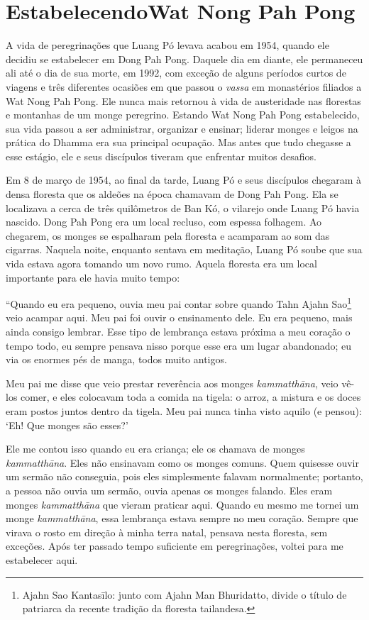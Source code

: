 \chapter[Estabelecendo Wat Nong Pah Pong]{Estabelecendo\newline Wat Nong Pah Pong}

A vida de peregrinações que Luang Pó levava acabou em 1954, quando ele
decidiu se estabelecer em Dong Pah Pong. Daquele dia em diante, ele
permaneceu ali até o dia de sua morte, em 1992, com exceção de alguns
períodos curtos de viagens e três diferentes ocasiões em que passou o
\emph{vassa} em monastérios filiados a Wat Nong Pah Pong. Ele nunca mais
retornou à vida de austeridade nas florestas e montanhas de um monge
peregrino. Estando Wat Nong Pah Pong estabelecido, sua vida passou a ser
administrar, organizar e ensinar; liderar monges e leigos na prática do
Dhamma era sua principal ocupação. Mas antes que tudo chegasse a esse
estágio, ele e seus discípulos tiveram que enfrentar muitos desafios.

Em 8 de março de 1954, ao final da tarde, Luang Pó e seus discípulos
chegaram à densa floresta que os aldeões na época chamavam de Dong Pah
Pong. Ela se localizava a cerca de três quilômetros de Ban Kó, o
vilarejo onde Luang Pó havia nascido. Dong Pah Pong era um local
recluso, com espessa folhagem. Ao chegarem, os monges se espalharam pela
floresta e acamparam ao som das cigarras. Naquela noite, enquanto
sentava em meditação, Luang Pó soube que sua vida estava agora tomando
um novo rumo. Aquela floresta era um local importante para ele havia
muito tempo:

``Quando eu era pequeno, ouvia meu pai contar sobre quando Tahn Ajahn
Sao\footnote{Ajahn Sao Kantasīlo: junto com Ajahn Man Bhuridatto, divide
  o título de patriarca da recente tradição da floresta tailandesa.}
veio acampar aqui. Meu pai foi ouvir o ensinamento dele. Eu era pequeno,
mais ainda consigo lembrar. Esse tipo de lembrança estava próxima a meu
coração o tempo todo, eu sempre pensava nisso porque esse era um lugar
abandonado; eu via os enormes pés de manga, todos muito antigos.

Meu pai me disse que veio prestar reverência aos monges
\emph{kammatthāna}, veio vê-los comer, e eles colocavam toda a comida na
tigela: o arroz, a mistura e os doces eram postos juntos dentro da
tigela. Meu pai nunca tinha visto aquilo (e pensou): `Eh! Que monges são
esses?'

Ele me contou isso quando eu era criança; ele os chamava de monges
\emph{kammatthāna}. Eles não ensinavam como os monges comuns. Quem
quisesse ouvir um sermão não conseguia, pois eles simplesmente falavam
normalmente; portanto, a pessoa não ouvia um sermão, ouvia apenas os
monges falando. Eles eram monges \emph{kammatthāna} que vieram praticar
aqui. Quando eu mesmo me tornei um monge \emph{kammatthāna}, essa
lembrança estava sempre no meu coração. Sempre que virava o rosto em
direção à minha terra natal, pensava nesta floresta, sem exceções. Após
ter passado tempo suficiente em peregrinações, voltei para me
estabelecer aqui.

